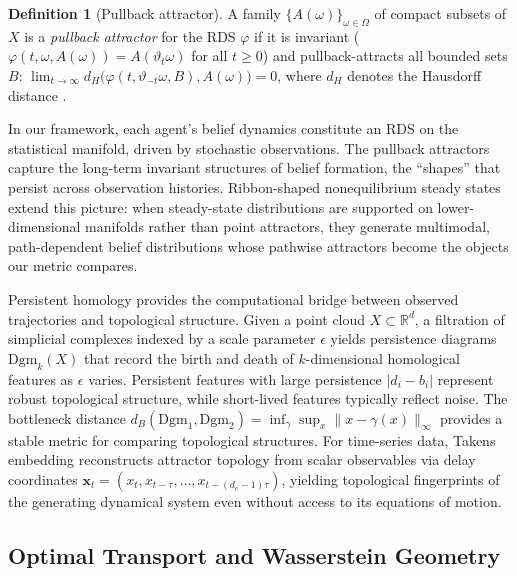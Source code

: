 \documentclass[11pt,a4paper]{article}
\theoremstyle{definition}
\newtheorem{definition}[claim]{Definition}
\newcommand{\R}{\mathbb{R}}
\begin{document}
\begin{definition}[Pullback attractor]
\label{def:pullback_attractor}
A family $\{A(\omega)\}_{\omega \in \Omega}$ of compact subsets of $X$ is a \emph{pullback attractor} for the RDS $\varphi$ if it is invariant ($\varphi(t, \omega, A(\omega)) = A(\vartheta_t \omega)$ for all $t \geq 0$) and pullback-attracts all bounded sets $B$: $\lim_{t \to \infty} d_H\bigl(\varphi(t, \vartheta_{-t}\omega, B), A(\omega)\bigr) = 0$, where $d_H$ denotes the Hausdorff distance \citep{crauel1994attractors}.
\end{definition}

In our framework, each agent's belief dynamics constitute an RDS on the statistical manifold, driven by stochastic observations. The pullback attractors capture the long-term invariant structures of belief formation, the ``shapes'' that persist across observation histories. Ribbon-shaped nonequilibrium steady states \citep{sakthivadivel2024ribbon} extend this picture: when steady-state distributions are supported on lower-dimensional manifolds rather than point attractors, they generate multimodal, path-dependent belief distributions whose pathwise attractors become the objects our metric compares.

Persistent homology \citep{edelsbrunner2000topological, carlsson2009topology} provides the computational bridge between observed trajectories and topological structure. Given a point cloud $X \subset \R^d$, a filtration of simplicial complexes indexed by a scale parameter $\epsilon$ yields persistence diagrams $\mathrm{Dgm}_k(X)$ that record the birth and death of $k$-dimensional homological features as $\epsilon$ varies. Persistent features with large persistence $|d_i - b_i|$ represent robust topological structure, while short-lived features typically reflect noise. The bottleneck distance $d_B(\mathrm{Dgm}_1, \mathrm{Dgm}_2) = \inf_\gamma \sup_{x} \|x - \gamma(x)\|_\infty$ provides a stable metric for comparing topological structures. For time-series data, Takens embedding \citep{takens1981detecting} reconstructs attractor topology from scalar observables via delay coordinates $\mathbf{x}_t = (x_t, x_{t-\tau}, \ldots, x_{t-(d_e-1)\tau})$, yielding topological fingerprints of the generating dynamical system even without access to its equations of motion.

\subsection{Optimal Transport and Wasserstein Geometry}
\label{sec:bg_ot}
\end{document}
